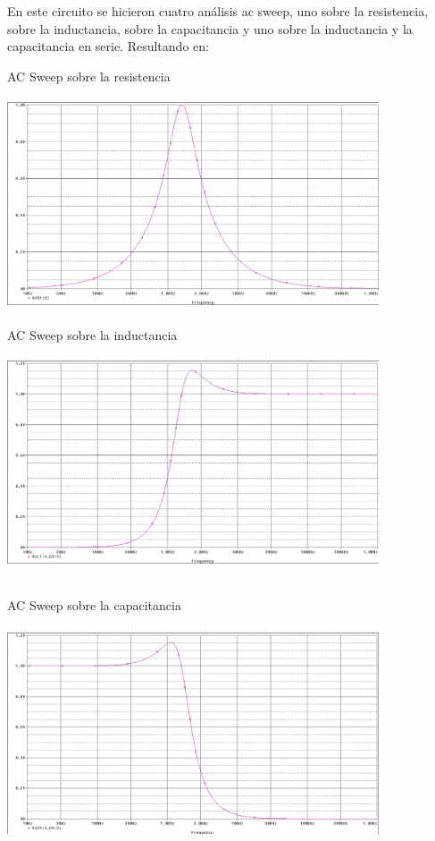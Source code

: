\documentclass[12pt]{article}
\begin{document}
\begin{itemize}
		\noindent En este circuito se hicieron cuatro análisis ac sweep, uno sobre la resistencia, sobre la inductancia, sobre la capacitancia y uno sobre la inductancia y la capacitancia en serie. Resultando en:
		
		\newpage
		
		\noindent AC Sweep sobre la resistencia\\
		
		\includegraphics[width=11cm,height=7cm]{Fuente_AC_RLC_AC_Sweep_Resistencia}\\
		
		\noindent AC Sweep sobre la inductancia\\
		
		\includegraphics[width=11cm,height=7cm]{Fuente_AC_RLC_AC_Sweep_L}
		
		\newpage
		
		\noindent AC Sweep sobre la capacitancia\\
		
		\includegraphics[width=11cm,height=7cm]{Fuente_AC_RLC_AC_Sweep_C}\\
		

\end{itemize}
\end{document}
